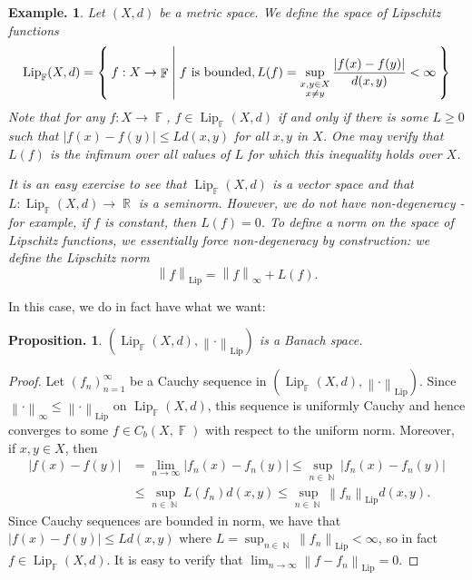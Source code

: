 \documentclass[11pt, a4paper]{memoir}
\DeclareMathOperator{\N}{{\mathbb{N}}}
\DeclareMathOperator{\R}{{\mathbb{R}}}
\DeclareMathOperator{\F}{{\mathbb{F}}}
\newcommand{\norm}[1]{\ensuremath{\left\lVert#1\right\rVert}}
\theoremstyle{change}
\newtheorem{proposition}[theorem]{Proposition.}
\theoremstyle{plain}
\theoremstyle{nonumberplain}
\newtheorem{example}{Example.}
\newtheorem{proof}{Proof}
\newcommand{\Lipspace}{\ensuremath{\operatorname{Lip}_{\F}(X,d)}}
\DeclareMathOperator{\Lip}{Lip}
\numberwithin{equation}{section}
\begin{document}
\begin{example}
    Let $(X,d)$ be a metric space.
    We define the space of \textit{Lipschitz functions}
    \begin{equation*}
        \Lipspace=\Set{f:X\to\F | f\text{ is bounded}, L(f)=\sup_{\substack{x,y\in X\\x\neq y}}\frac{|f(x)-f(y)|}{d(x,y)}<\infty}
    \end{equation*}
    Note that for any $f:X\to\F$, $f\in\Lipspace$ if and only if there is some $L\geq 0$ such that $|f(x)-f(y)|\leq Ld(x,y)$ for all $x,y$ in $X$.
    One may verify that $L(f)$ is the infimum over all values of $L$ for which this inequality holds over $X$.

    It is an easy exercise to see that $\Lipspace$ is a vector space and that $L:\Lipspace\to\R$ is a seminorm.
    However, we do not have non-degeneracy - for example, if $f$ is constant, then $L(f)=0$.
    To define a norm on the space of Lipschitz functions, we essentially force non-degeneracy by construction: we define the \textit{Lipschitz norm}
    \begin{equation*}
        \norm{f}_{\Lip}=\norm{f}_\infty+L(f).
    \end{equation*}
\end{example}
In this case, we do in fact have what we want:
\begin{proposition}
    $(\Lipspace,\norm{\cdot}_{\Lip})$ is a Banach space.
\end{proposition}
\begin{proof}
    Let $(f_n)_{n=1}^\infty$ be a Cauchy sequence in $(\Lipspace,\norm{\cdot}_{\Lip})$.
    Since $\norm{\cdot}_\infty\leq\norm{\cdot}_{\Lip}$ on $\Lipspace$, this sequence is uniformly Cauchy and hence converges to some $f\in C_b(X,\F)$ with respect to the uniform norm.
    Moreover, if $x,y\in X$, then
    \begin{align*}
        |f(x)-f(y)| &= \lim_{n\to\infty}|f_n(x)-f_n(y)|\leq \sup_{n\in\N}|f_n(x)-f_n(y)|\\
                    &\leq \sup_{n\in\N} L(f_n)d(x,y)\leq\sup_{n\in\N}\norm{f_n}_{\Lip} d(x,y).
    \end{align*}
    Since Cauchy sequences are bounded in norm, we have that $|f(x)-f(y)|\leq Ld(x,y)$ where $L=\sup_{n\in\N}\norm{f_n}_{\Lip}<\infty$, so in fact $f\in\Lipspace$.
    It is easy to verify that $\lim_{n\to\infty}\norm{f-f_n}_{\Lip}=0$.
\end{proof}
\end{document}
